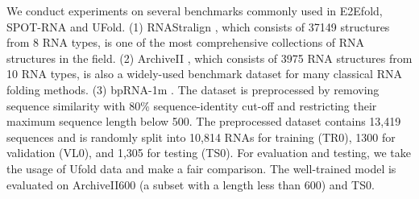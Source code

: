 We conduct experiments on several benchmarks commonly used in E2Efold, SPOT-RNA and UFold.
(1) RNAStralign \cite{tan2017turbofold}, which consists of 37149 structures from 8 RNA types, is one of the most comprehensive collections of RNA structures in the field.
(2) ArchiveII \cite{sloma2016exact}, which consists of 3975 RNA structures from 10 RNA types, is also a widely-used benchmark dataset for many classical RNA folding methods.
(3) bpRNA-1m \cite{singh2019rna}. The dataset is preprocessed by removing sequence similarity with 80\% sequence-identity cut-off and restricting their maximum sequence length below 500. The preprocessed dataset contains 13,419 sequences and is randomly split into 10,814 RNAs for training (TR0), 1300 for validation (VL0), and 1,305 for testing (TS0).
For evaluation and testing, we take the usage of Ufold \cite{fu2021ufold} data and make a fair comparison. The well-trained model is evaluated on ArchiveII600 (a subset with a length less than 600) and TS0.


